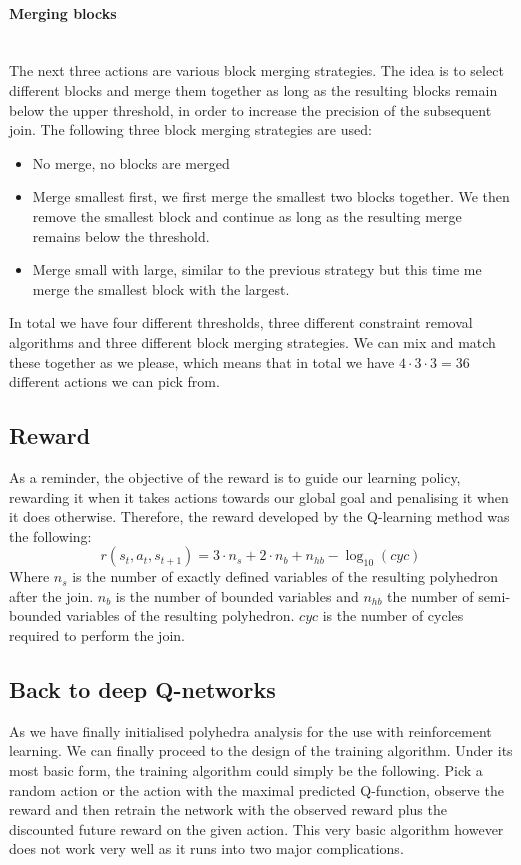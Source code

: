 \paragraph{Merging blocks}\mbox{}\\
The next three actions are various block merging strategies. The idea is to select different blocks and merge them together as long as the resulting blocks remain below the upper threshold, in order to increase the precision of the subsequent join. The following three block merging strategies are used:
\begin{itemize}
	\item No merge, no blocks are merged
	\item Merge smallest first, we first merge the smallest two blocks together. We then remove the smallest block and continue as long as the resulting merge remains below the threshold.
	\item Merge small with large, similar to the previous strategy but this time me merge the smallest block with the largest.
\end{itemize}

In total we have four different thresholds, three different constraint removal algorithms and three different block merging strategies. We can mix and match these together as we please, which means that in total we have $4\cdot 3\cdot 3 =36$ different actions we can pick from.

\subsection{Reward}
As a reminder, the objective of the reward is to guide our learning policy, rewarding it when it takes actions towards our global goal and penalising it when it does otherwise. Therefore, the reward developed by the Q-learning method was the following:
\begin{equation}
	r(s_t,a_t,s_{t+1}) = 3  \cdot n_s + 2 \cdot n_b + n_{hb} - \log_{10}(cyc)
\end{equation}
Where $n_s$ is the number of exactly defined variables of the resulting polyhedron after the join. $n_b$ is the number of bounded variables and $n_{hb}$ the number of semi-bounded variables of the resulting polyhedron. $cyc$ is the number of cycles required to perform the join.
\subsection{Back to deep Q-networks}
As we have finally initialised polyhedra analysis for the use with reinforcement learning. We can finally proceed to the design of the training algorithm. Under its most basic form, the training algorithm could simply be the following. Pick a random action or the action with the maximal predicted Q-function, observe the reward and then retrain the network with the observed reward plus the discounted future reward on the given action. This very basic algorithm however does not work very well as it runs into two major complications.

